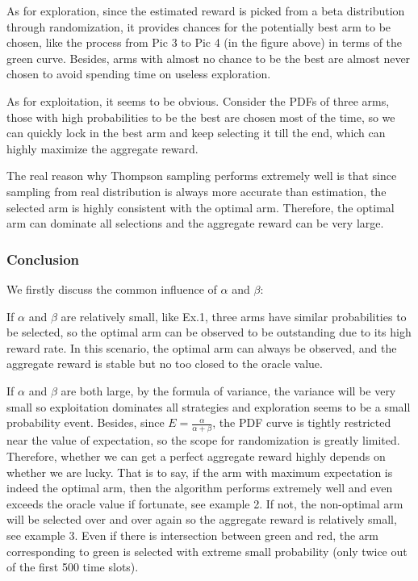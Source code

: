\documentclass[11pt]{article}
\begin{document}
As for exploration, since the estimated reward is picked from a beta
distribution through randomization, it provides chances for the
potentially best arm to be chosen, like the process from Pic 3 to Pic 4
(in the figure above) in terms of the green curve. Besides, arms with
almost no chance to be the best are almost never chosen to avoid
spending time on useless exploration.

As for exploitation, it seems to be obvious. Consider the PDFs of three
arms, those with high probabilities to be the best are chosen most of
the time, so we can quickly lock in the best arm and keep selecting it
till the end, which can highly maximize the aggregate reward.

The real reason why Thompson sampling performs extremely well is that
since sampling from real distribution is always more accurate than
estimation, the selected arm is highly consistent with the optimal arm.
Therefore, the optimal arm can dominate all selections and the aggregate
reward can be very large.

    \hypertarget{conclusion}{%
\subsubsection{Conclusion}\label{conclusion}}

    We firstly discuss the common influence of \(\alpha\) and \(\beta\):

If \(\alpha\) and \(\beta\) are relatively small, like Ex.1, three arms
have similar probabilities to be selected, so the optimal arm can be
observed to be outstanding due to its high reward rate. In this
scenario, the optimal arm can always be observed, and the aggregate
reward is stable but no too closed to the oracle value.

If \(\alpha\) and \(\beta\) are both large, by the formula of variance,
the variance will be very small so exploitation dominates all strategies
and exploration seems to be a small probability event. Besides, since
\(E=\frac{\alpha}{\alpha+\beta}\), the PDF curve is tightly restricted
near the value of expectation, so the scope for randomization is greatly
limited. Therefore, whether we can get a perfect aggregate reward highly
depends on whether we are lucky. That is to say, if the arm with maximum
expectation is indeed the optimal arm, then the algorithm performs
extremely well and even exceeds the oracle value if fortunate, see
example 2. If not, the non-optimal arm will be selected over and over
again so the aggregate reward is relatively small, see example 3. Even
if there is intersection between green and red, the arm corresponding to
green is selected with extreme small probability (only twice out of the
first 500 time slots).
\end{document}
